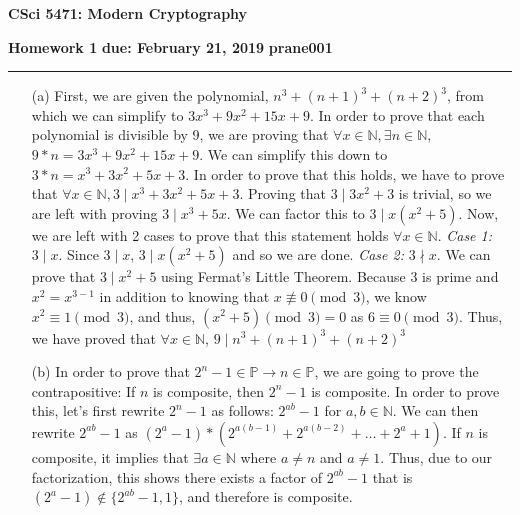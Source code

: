 \documentclass[11pt]{article}
\newcounter{qnum}
\newcommand{\question}[1]{\stepcounter{qnum}\bigskip\noindent{\bf \arabic{qnum}. #1.}}
\newcommand\NetIDa{prane001}
\begin{document}
\begin{center}
  {\Large \bf CSci 5471: Modern Cryptography}
\end{center}
{\bf Homework 1} \hfill {\bf due: February 21, 2019}
\newline
{\bf \NetIDa} \hfill  
\medskip
\hrule
\medskip

\question{Number Theory I}
\begin{itemize}
  \item[(a)]   
    First, we are given the polynomial, $n^{3}  + (n+1)^{3} + (n+2)^{3}$, from which we can 
    simplify  to $3 x^{3} + 9 x^{2} + 15 x + 9$. In order to prove that each polynomial is
    divisible by 9, we are proving that $\forall x \in \mathbb{N},  \exists n \in \mathbb{N}$, 
    $9* n =  3 x^{3} + 9 x^{2} + 15 x + 9$. We can simplify this down to
    $3* n =   x^{3} + 3 x^{2} + 5 x + 3$. In order to prove that this holds, we have to prove 
    that $\forall x \in \mathbb{N},  3 \mid x^{3} + 3x^{2} + 5x + 3$. Proving that 
    $3 \mid 3x^{2} + 3$ is trivial, so we are left with proving $3 \mid x^{3} + 5x$. We can factor
    this to $3 \mid x(x^{2} + 5)$. Now, we are left with 2 cases to prove that this statement
    holds $\forall x \in \mathbb{N}$. 
    \newline \textit{Case 1:} $3\mid x$. Since $3\mid x$, $3 \mid x(x^{2} + 5)$ and so we are done.
    \newline \textit{Case 2:} $3\nmid x$. We can prove that $3\mid x^{2} + 5$ using 
    Fermat's Little Theorem. Because 3 is prime and $x^{2} = x^{3-1}$ in addition to knowing
    that $x \not \equiv 0 \pmod{3}$, we know 
    $x^{2} \equiv 1 \pmod{3}$, and thus, $(x^{2} + 5) \pmod{3} = 0$ as $6 \equiv 0 \pmod{3}$. 
    \newline Thus, we have proved that $\forall x \in \mathbb{N}$, $9 \mid n^{3}  + (n+1)^{3} +
    (n+2)^{3}$
  \item[(b)]
    In order to prove that $2^{n} -1 \in \mathbb{P} \rightarrow n \in \mathbb{P}$, we are going to 
    prove the contrapositive: If $n$ is composite, then $2^{n} -1$ is composite. In order to prove
    this, let's first rewrite $2^{n} -1$ as follows: $2^{ab} -1$ for $a,b \in \mathbb{N}$. 
    We can then rewrite $2^{ab} -1$ as $(2^{a} -1) * (2^{a(b-1)} + 2^{a(b-2)} +
    \dots + 2^{a} + 1)$. If $n$ is composite, it implies that $\exists a \in \mathbb{N}$ where
    $a \neq n$ and $a \neq 1$. Thus, due to our factorization, this shows there exists a factor
    of $2^{ab} -1$ that is $(2^{a} -1) \not \in \{2^{ab} -1 , 1\}$, and therefore is composite. 

\end{itemize}
\end{document}
